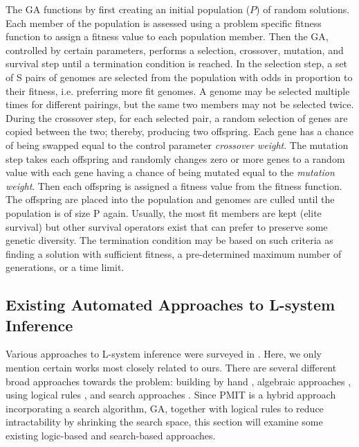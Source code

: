 \documentclass{llncs}
\begin{document}
	
	The GA functions by first creating an initial population ($P$) of random solutions. Each member of the population is assessed using a problem specific fitness function to assign a fitness value to each population member. Then the GA, controlled by certain parameters, performs a selection, crossover, mutation, and survival step until a termination condition is reached. In the selection step, a set of S pairs of genomes are selected from the population with odds in proportion to their fitness, i.e. preferring more fit genomes. A genome may be selected multiple times for different pairings, but the same two members may not be selected twice. During the crossover step, for each selected pair, a random selection of genes are copied between the two; thereby, producing two offspring. Each gene has a chance of being swapped equal to the control parameter \textit{crossover weight}. The mutation step takes each offspring and randomly changes zero or more genes to a random value with each gene having a chance of being mutated equal to the \textit{mutation weight}. Then each offspring is assigned a fitness value from the fitness function. The offspring are placed into the population and genomes are culled until the population is of size P again. Usually, the most fit members are kept (elite survival) but other survival operators exist that can prefer to preserve some genetic diversity. The termination condition may be based on such criteria as finding a solution with sufficient fitness, a pre-determined maximum number of generations, or a time limit.
	
	\subsection{Existing Automated Approaches to L-system Inference}
	
	Various approaches to L-system inference were surveyed in \cite{ben_naoum_surveryLsystems}. Here, we only mention certain works most closely related to ours. There are several different broad approaches towards the problem: building by hand \cite{beauty}, algebraic approaches \cite{doucet_algebra, nakano_inferD0Lerrorfree}, using logical rules \cite{nakano_inferD0Lerrorfree}, and search approaches \cite{runqiang_inferGA}. Since PMIT is a hybrid approach incorporating a search algorithm, GA, together with logical rules to reduce intractability by shrinking the search space, this section will examine some existing logic-based and search-based approaches.
	
\end{document}
